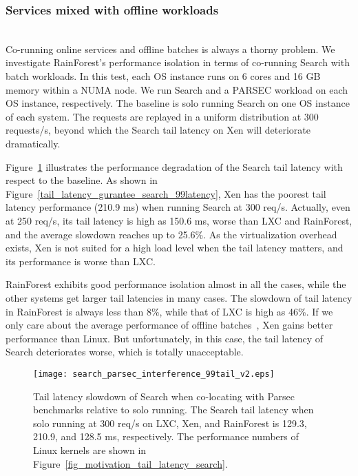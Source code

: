 \documentclass[pageno]{jpaper}
\begin{document}
\subsubsection{Services mixed with offline workloads}\label{mixed_search_parsec_static}
\textrm{\\} Co-running online services and offline batches is always a thorny problem.
We investigate RainForest's performance isolation in terms of co-running Search with batch workloads. In this test, each OS instance runs on 6 cores and 16 GB memory within a NUMA node. We run Search and a PARSEC workload on each OS instance, respectively. The baseline is solo running Search on one OS instance of each system. The requests are replayed in a uniform distribution at 300 requests/s, beyond which the Search tail latency on  Xen will deteriorate dramatically.

Figure~\ref{fig_tail_latency_parsec} illustrates the performance degradation of the Search tail latency with respect to the baseline. As shown in  Figure~\ref{tail_latency_gurantee_search_99latency}, Xen has the poorest tail latency performance (210.9 ms) when running Search at 300 req/s. Actually, even at 250 req/s, its tail latency is high as 150.6 ms, worse than LXC and RainForest, and the average slowdown reaches up to 25.6\%. As the virtualization overhead exists, Xen is not suited for a high load level when the tail latency matters, and its performance is worse than LXC.

RainForest exhibits good performance isolation almost in all the cases, while the other systems get larger tail latencies in many cases. The slowdown of tail latency in RainForest is always less than 8\%, while that of LXC is high as 46\%. If we only care about the average performance of offline batches~\cite{barham2003xen}, Xen gains better performance than Linux. But unfortunately, in this case, the tail latency of Search deteriorates worse, which is totally unacceptable.








\begin{figure}[t]
\setlength{\abovecaptionskip}{3pt}
\setlength{\belowcaptionskip}{0pt}
  \centering
\texttt{[image: search\_parsec\_interference\_99tail\_v2.eps]}  \caption{Tail latency slowdown of Search when co-locating with Parsec benchmarks relative to solo running. The Search tail latency when solo running at 300 req/s  on LXC, Xen, and RainForest is 129.3, 210.9, and 128.5 ms, respectively. The performance numbers of Linux kernels are shown in Figure~\ref{fig_motivation_tail_latency_search}.}
  \label{fig_tail_latency_parsec}
\end{figure}
\end{document}
